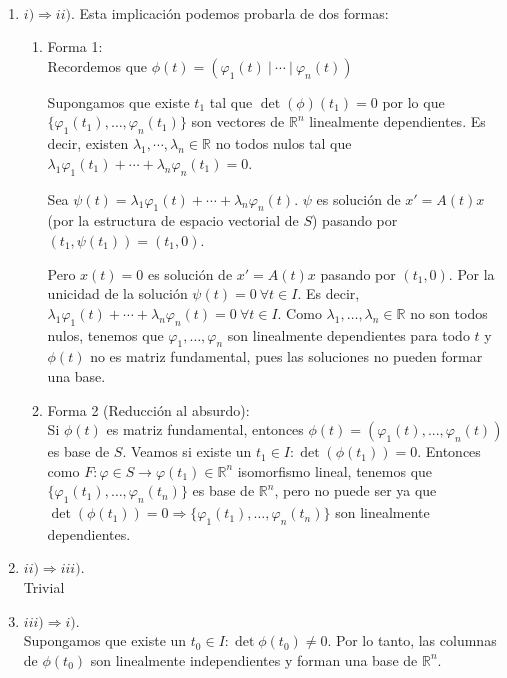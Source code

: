 \documentclass[11pt]{article}
\makeatletter
\theoremstyle{theorem-style}  %
\renewenvironment{proof}[1][\proofname]{\par
	\pushQED{\qed}%
	\normalfont \topsep6\p@\@plus6\p@\relax
	\list{}{%
		\settowidth{\leftmargin}{\quad:\hskip\labelsep}%
		\setlength{\labelwidth}{0pt}%
		\setlength{\itemindent}{-\leftmargin}%
	}%
	\item[\hskip\labelsep\itshape#1\@addpunct{:}]\ignorespaces
}{%
	\popQED\endlist\@endpefalse
}
\theoremstyle{definition-style}
\theoremstyle{example-style}
\makeatother
\begin{document}
\begin{proof}\
	\begin{enumerate}
		\item $ i) \Rightarrow ii) $. Esta implicación podemos probarla de dos formas:
		\begin{enumerate}[\quad a)]
			\item Forma 1: \\
			Recordemos que $\phi (t)= (\varphi_1(t) \ | \ \cdots \ | \ \varphi_n(t)) $
			
			Supongamos que existe $ t_1 $ tal que  $ \det(\phi)(t_1)=0$ por lo que $\{ \varphi_1(t_1), \dots, \varphi_n(t_1) \} $ son vectores de $ \mathbb{R}^n  $ linealmente dependientes. Es decir, existen $ \lambda_1, \cdots, \lambda_n \in \mathbb{R}$ no todos nulos tal que $ \lambda_1 \varphi_1(t_1) + \cdots +\lambda_n\varphi_n(t_1)=0 $.
			
			Sea $ \psi(t)=\lambda_1 \varphi_1(t) + \cdots +\lambda_n\varphi_n(t) $. $ \psi $ es solución de $ x'=A(t)x $ (por la estructura de espacio vectorial de $ S $) pasando por $ (t_1,\psi(t_1))=(t_1,0) $.
			
			Pero $ x(t)=0 $ es solución de $ x'=A(t)x$ pasando por $ (t_1,0) $.
			Por la unicidad de la solución $ \psi(t)=0 \ \forall t \in I$. Es decir, $ \lambda_1 \varphi_1(t) + \cdots +\lambda_n\varphi_n(t) =0 \ \forall t \in I $. Como   $ \lambda_1, \dots, \lambda_n \in \mathbb{R}$ no son  todos nulos, tenemos que $ \varphi_1, \dots, \varphi_n $ son linealmente dependientes para todo $ t $ y $ \phi(t) $ no es matriz fundamental, pues las soluciones no pueden formar una base.
			\item Forma 2 (Reducción al absurdo): \\
			Si $ \phi(t) $ es matriz fundamental, entonces $ \phi(t)=(\varphi_1(t), ... , \varphi_n(t)) $ es base de $ S $.
			Veamos si existe un $ t_1 \in I : \det(\phi(t_1))=0$.
			Entonces como $ F:\varphi\in S\longrightarrow \varphi(t_1)\in  \mathbb{R}^n $ isomorfismo lineal, tenemos que $ \{ \varphi_1(t_1), \dots , \varphi_n(t_n) \}  $ es base de $ \mathbb{R}^n $, pero no puede ser ya que $ \det(\phi(t_1))=0 \Rightarrow \{ \varphi_1(t_1), \dots , \varphi_n(t_n) \} $ son linealmente dependientes.
		\end{enumerate}
	\item $ ii) \Rightarrow iii) $. \\
	Trivial
	\item $ iii) \Rightarrow i) $. \\
	Supongamos que existe un $ t_0 \in I : \det \phi (t_0)\neq 0 $. Por lo tanto, las columnas de $ \phi(t_0) $ son linealmente independientes y forman una base de $ \mathbb{R}^n $.
	

\end{enumerate}
\end{proof}
\end{document}
